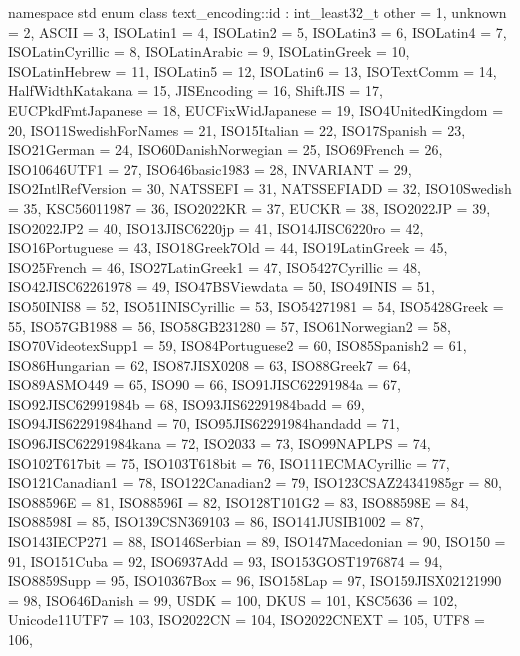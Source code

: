 %
\begin{codeblock}
namespace std {
  enum class text_encoding::id : int_least32_t {
    other = 1,
    unknown = 2,
    ASCII = 3,
    ISOLatin1 = 4,
    ISOLatin2 = 5,
    ISOLatin3 = 6,
    ISOLatin4 = 7,
    ISOLatinCyrillic = 8,
    ISOLatinArabic = 9,
    ISOLatinGreek = 10,
    ISOLatinHebrew = 11,
    ISOLatin5 = 12,
    ISOLatin6 = 13,
    ISOTextComm = 14,
    HalfWidthKatakana = 15,
    JISEncoding = 16,
    ShiftJIS = 17,
    EUCPkdFmtJapanese = 18,
    EUCFixWidJapanese = 19,
    ISO4UnitedKingdom = 20,
    ISO11SwedishForNames = 21,
    ISO15Italian = 22,
    ISO17Spanish = 23,
    ISO21German = 24,
    ISO60DanishNorwegian = 25,
    ISO69French = 26,
    ISO10646UTF1 = 27,
    ISO646basic1983 = 28,
    INVARIANT = 29,
    ISO2IntlRefVersion = 30,
    NATSSEFI = 31,
    NATSSEFIADD = 32,
    ISO10Swedish = 35,
    KSC56011987 = 36,
    ISO2022KR = 37,
    EUCKR = 38,
    ISO2022JP = 39,
    ISO2022JP2 = 40,
    ISO13JISC6220jp = 41,
    ISO14JISC6220ro = 42,
    ISO16Portuguese = 43,
    ISO18Greek7Old = 44,
    ISO19LatinGreek = 45,
    ISO25French = 46,
    ISO27LatinGreek1 = 47,
    ISO5427Cyrillic = 48,
    ISO42JISC62261978 = 49,
    ISO47BSViewdata = 50,
    ISO49INIS = 51,
    ISO50INIS8 = 52,
    ISO51INISCyrillic = 53,
    ISO54271981 = 54,
    ISO5428Greek = 55,
    ISO57GB1988 = 56,
    ISO58GB231280 = 57,
    ISO61Norwegian2 = 58,
    ISO70VideotexSupp1 = 59,
    ISO84Portuguese2 = 60,
    ISO85Spanish2 = 61,
    ISO86Hungarian = 62,
    ISO87JISX0208 = 63,
    ISO88Greek7 = 64,
    ISO89ASMO449 = 65,
    ISO90 = 66,
    ISO91JISC62291984a = 67,
    ISO92JISC62991984b = 68,
    ISO93JIS62291984badd = 69,
    ISO94JIS62291984hand = 70,
    ISO95JIS62291984handadd = 71,
    ISO96JISC62291984kana = 72,
    ISO2033 = 73,
    ISO99NAPLPS = 74,
    ISO102T617bit = 75,
    ISO103T618bit = 76,
    ISO111ECMACyrillic = 77,
    ISO121Canadian1 = 78,
    ISO122Canadian2 = 79,
    ISO123CSAZ24341985gr = 80,
    ISO88596E = 81,
    ISO88596I = 82,
    ISO128T101G2 = 83,
    ISO88598E = 84,
    ISO88598I = 85,
    ISO139CSN369103 = 86,
    ISO141JUSIB1002 = 87,
    ISO143IECP271 = 88,
    ISO146Serbian = 89,
    ISO147Macedonian = 90,
    ISO150 = 91,
    ISO151Cuba = 92,
    ISO6937Add = 93,
    ISO153GOST1976874 = 94,
    ISO8859Supp = 95,
    ISO10367Box = 96,
    ISO158Lap = 97,
    ISO159JISX02121990 = 98,
    ISO646Danish = 99,
    USDK = 100,
    DKUS = 101,
    KSC5636 = 102,
    Unicode11UTF7 = 103,
    ISO2022CN = 104,
    ISO2022CNEXT = 105,
    UTF8 = 106,
}}
\end{codeblock}
